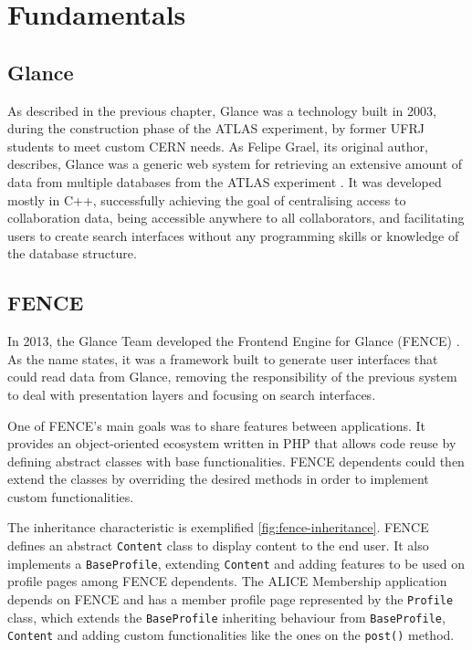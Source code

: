 \chapter{Fundamentals}
\label{chap2}

\section{Glance}

As described in the previous chapter, Glance \cite{grael-tcc} \cite{maidantchik-glance} was a technology built in 2003, during the construction phase of the ATLAS experiment, by former UFRJ students to meet custom CERN needs. As Felipe Grael, its original author, describes, Glance was a generic web system for retrieving an extensive amount of data from multiple databases from the ATLAS experiment \cite{grael-tcc}. It was developed mostly in C++, successfully achieving the goal of centralising access to collaboration data, being accessible anywhere to all collaborators, and facilitating users to create search interfaces without any programming skills or knowledge of the database structure.


\section{FENCE}

In 2013, the Glance Team developed the Frontend Engine for Glance (FENCE) \cite{lange-tcc}. As the name states, it was a framework built to generate user interfaces that could read data from Glance, removing the responsibility of the previous system to deal with presentation layers and focusing on search interfaces.

One of FENCE's main goals was to share features between applications. It provides an object-oriented ecosystem written in PHP that allows code reuse by defining abstract classes with base functionalities. FENCE dependents could then extend the classes by overriding the desired methods in order to implement custom functionalities.

The inheritance characteristic is exemplified \autoref{fig:fence-inheritance}. FENCE defines an abstract \texttt{Content} class to display content to the end user. It also implements a \texttt{BaseProfile}, extending \texttt{Content} and adding features to be used on profile pages among FENCE dependents. The ALICE Membership application depends on FENCE and has a member profile page represented by the \texttt{Profile} class, which extends the \texttt{BaseProfile} inheriting behaviour from \texttt{BaseProfile}, \texttt{Content} and adding custom functionalities like the ones on the \texttt{post()} method.

